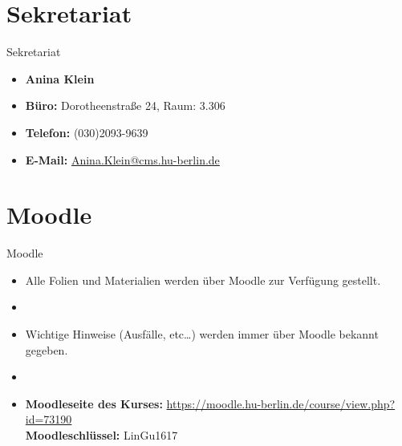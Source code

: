 %
\section{Sekretariat}

\begin{frame}{Sekretariat}
	
\begin{itemize}
	\item[] \textbf{Anina Klein}	
	\item \textbf{Büro:} Dorotheenstraße 24, Raum: 3.306
	\item \textbf{Telefon:} (030)2093-9639
	\item \textbf{E-Mail:} \href{mailto:Anina.Klein@cms.hu-berlin.de}{Anina.Klein@cms.hu-berlin.de}
\end{itemize}	

\end{frame}



%
\section{Moodle}	

\begin{frame}{Moodle}

\begin{itemize}
	\item Alle Folien und Materialien werden über Moodle zur Verfügung gestellt.
	\item[]
	\item Wichtige Hinweise (Ausfälle, etc\dots) werden immer über Moodle bekannt gegeben.
	\item[]
	\item \textbf{Moodleseite des Kurses:} \url{https://moodle.hu-berlin.de/course/view.php?id=73190}\\
	\textbf{Moodleschlüssel:} LinGu1617
\end{itemize}		

\end{frame}

